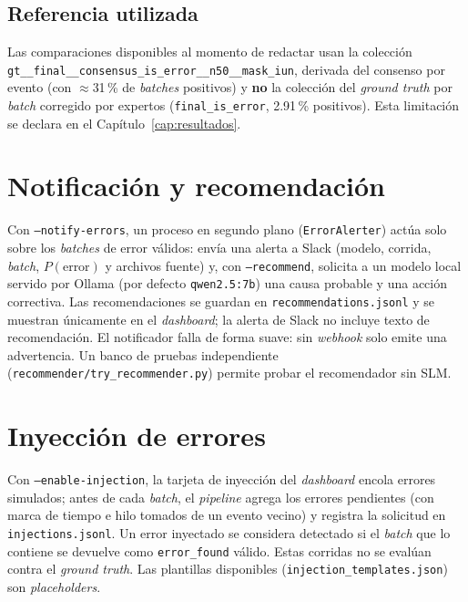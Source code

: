 \subsection{Referencia utilizada}

Las comparaciones disponibles al momento de redactar usan la colección \texttt{gt\_\_final\_\_consensus\_is\_error\_\_n50\_\_mask\_iun}, derivada del consenso por evento (con $\approx$31\,\% de \textit{batches} positivos) y \textbf{no} la colección del \textit{ground truth} por \textit{batch} corregido por expertos (\texttt{final\_is\_error}, 2.91\,\% positivos). Esta limitación se declara en el Capítulo~\ref{cap:resultados}.

\section{Notificación y recomendación}\label{sec:met_notificacion}

Con \texttt{--notify-errors}, un proceso en segundo plano (\texttt{ErrorAlerter}) actúa solo sobre los \textit{batches} de error válidos: envía una alerta a Slack (modelo, corrida, \textit{batch}, $P(\text{error})$ y archivos fuente) y, con \texttt{--recommend}, solicita a un modelo local servido por Ollama (por defecto \texttt{qwen2.5:7b}) una causa probable y una acción correctiva. Las recomendaciones se guardan en \texttt{recommendations.jsonl} y se muestran únicamente en el \textit{dashboard}; la alerta de Slack no incluye texto de recomendación. El notificador falla de forma suave: sin \textit{webhook} solo emite una advertencia. Un banco de pruebas independiente (\texttt{recommender/try\_recommender.py}) permite probar el recomendador sin SLM.

\section{Inyección de errores}\label{sec:met_inyeccion}

Con \texttt{--enable-injection}, la tarjeta de inyección del \textit{dashboard} encola errores simulados; antes de cada \textit{batch}, el \textit{pipeline} agrega los errores pendientes (con marca de tiempo e hilo tomados de un evento vecino) y registra la solicitud en \texttt{injections.jsonl}. Un error inyectado se considera detectado si el \textit{batch} que lo contiene se devuelve como \texttt{error\_found} válido. Estas corridas no se evalúan contra el \textit{ground truth}. Las plantillas disponibles (\texttt{injection\_templates.json}) son \textit{placeholders}.

